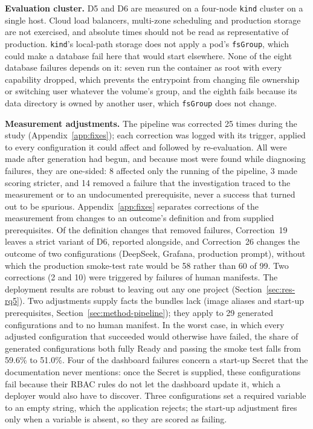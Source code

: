 \textbf{Evaluation cluster.} D5 and D6 are measured on a four-node \texttt{kind} cluster on a single host. Cloud load balancers, multi-zone scheduling and production storage are not exercised, and absolute times should not be read as representative of production. \texttt{kind}'s local-path storage does not apply a pod's \texttt{fsGroup}, which could make a database fail here that would start elsewhere. None of the eight database failures depends on it: seven run the container as root with every capability dropped, which prevents the entrypoint from changing file ownership or switching user whatever the volume's group, and the eighth fails because its data directory is owned by another user, which \texttt{fsGroup} does not change.

\textbf{Measurement adjustments.} The pipeline was corrected 25 times during the study (Appendix~\ref{app:fixes}); each correction was logged with its trigger, applied to every configuration it could affect and followed by re-evaluation. All were made after generation had begun, and because most were found while diagnosing failures, they are one-sided: 8 affected only the running of the pipeline, 3 made scoring stricter, and 14 removed a failure that the investigation traced to the measurement or to an undocumented prerequisite, never a success that turned out to be spurious. Appendix~\ref{app:fixes} separates corrections of the measurement from changes to an outcome's definition and from supplied prerequisites. Of the definition changes that removed failures, Correction~19 leaves a strict variant of D6, reported alongside, and Correction~26 changes the outcome of two configurations (DeepSeek, Grafana, production prompt), without which the production smoke-test rate would be 58 rather than 60 of 99. Two corrections (2 and 10) were triggered by failures of human manifests. The deployment results are robust to leaving out any one project (Section~\ref{sec:res-rq5}). Two adjustments supply facts the bundles lack (image aliases and start-up prerequisites, Section~\ref{sec:method-pipeline}); they apply to 29 generated configurations and to no human manifest. In the worst case, in which every adjusted configuration that succeeded would otherwise have failed, the share of generated configurations both fully Ready and passing the smoke test falls from 59.6\% to 51.0\%. Four of the dashboard failures concern a start-up Secret that the documentation never mentions: once the Secret is supplied, these configurations fail because their RBAC rules do not let the dashboard update it, which a deployer would also have to discover. Three configurations set a required variable to an empty string, which the application rejects; the start-up adjustment fires only when a variable is absent, so they are scored as failing.

